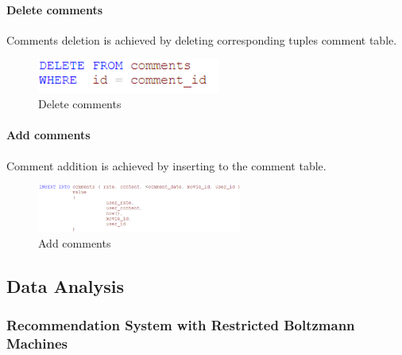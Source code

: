 \begin{CJK*}{UTF8}{gbsn}
\paragraph{Delete comments} 
Comments deletion is achieved by deleting corresponding tuples comment table.
\begin{figure}[htbp]
\centering
\includegraphics[width=6cm]{del_com.png}
\caption{Delete comments}
\end{figure}

\paragraph{Add comments} 
Comment addition is achieved by inserting to the comment table.
\begin{figure}[h]
    \centering
    \includegraphics[width=0.6\textwidth]{add_comm.png}
    \caption{Add comments}
\end{figure}

\newpage
\newpage
\subsection{Data Analysis}
\subsubsection{Recommendation System with Restricted Boltzmann Machines}


\end{CJK*}
